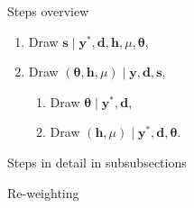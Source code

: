 Steps overview

\begin{enumerate}
	\item Draw $\bm{s}\mid\bm{y}^\ast,\bm{d},\bm{h},\mu,\bm\theta$,
	\item Draw $(\bm\theta,\bm h,\mu)\mid\bm y,\bm d,\bm s$,
	\begin{enumerate}
		\item Draw $\bm\theta\mid\bm{y}^\ast,\bm{d}$,
		\item Draw $(\bm{h},\mu)\mid\bm{y}^\ast,\bm{d},\bm\theta$.
	\end{enumerate}
\end{enumerate}

Steps in detail in subsubsections

Re-weighting